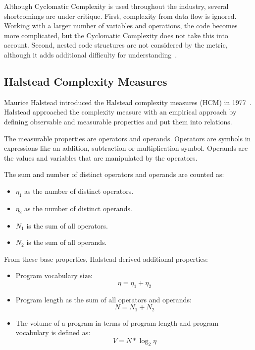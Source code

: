 Although Cyclomatic Complexity is used throughout the industry, several shortcomings are under critique. First, complexity from data flow is ignored. Working with a larger number of variables and operations, the code becomes more complicated, but the Cyclomatic Complexity does not take this into account. Second, nested code structures are not considered by the metric, although it adds additional difficulty for understanding~\cite{yu_survey_2010}.

\subsection{Halstead Complexity Measures}
Maurice Halstead introduced the Halstead complexity measures (HCM) in 1977~\cite{halstead1977elements}. Halstead approached the complexity measure with an empirical approach by defining observable and measurable properties and put them into relations.

The measurable properties are operators and operands. Operators are symbols in expressions like an addition, subtraction or multiplication symbol. Operands are the values and variables that are manipulated by the operators. 

The sum and number of distinct operators and operands are counted as:
\begin{itemize}
    \item $\eta_1$ as the number of distinct operators.
    \item $\eta_2$ as the number of distinct operands.
    \item $N_1$ is the sum of all operators.
    \item $N_2$ is the sum of all operands. 
\end{itemize}

From these base properties, Halstead derived additional properties:
\begin{itemize}
    \item Program vocabulary size:
    \begin{displaymath}
        \eta = \eta_1 + \eta_2
    \end{displaymath}
    \item Program length as the sum of all operators and operands:
    \begin{displaymath}
        N = N_1 + N_2
    \end{displaymath}
    \item The volume of a program in terms of program length and program vocabulary is defined as: 
    \begin{displaymath}
        V = N * \log_2{\eta}
    \end{displaymath}
\end{itemize}


